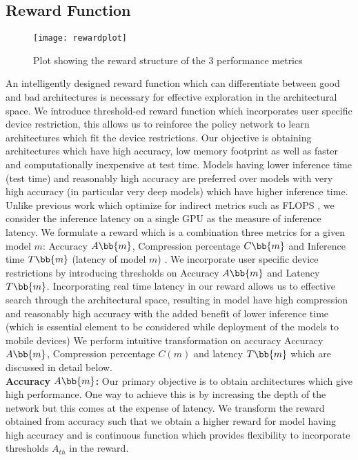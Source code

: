 \documentclass[../main]{subfiles}
\begin{document}
    \subsection{Reward Function}
        \label{sec:num3}
        \begin{figure}[t]
			\centering
			\texttt{[image: rewardplot]}
			\caption{Plot showing the reward structure of the 3 performance metrics}
			\label{fig:rewardfunction}
		\end{figure}
        An intelligently designed reward function which can differentiate between good and bad architectures is necessary for effective exploration in the architectural space.
        We introduce threshold-ed reward function which incorporates user specific device restriction, this allows us to reinforce the policy network to learn architectures which fit the device restrictions.
        Our objective is obtaining architectures which have high accuracy, low memory footprint as well as faster and computationally inexpensive at test time.
        Models having lower inference time (test time) and reasonably high accuracy are preferred over models with very high accuracy (in particular very deep models) which have higher inference time.
        Unlike previous work which optimize for indirect metrics such as FLOPS \cite{he2018amc}, we consider the inference latency on a single GPU as the measure of inference latency.
        We formulate a reward which is a combination three metrics for a given model $m$: Accuracy $A \bb{m}$, Compression percentage $C \bb{m}$ and Inference time $T \bb{m}$ (latency of model $m$) .
        We incorporate user specific device restrictions by introducing thresholds on Accuracy $A \bb{m}$ and Latency $T \bb{m}$.
        Incorporating real time latency in our reward allows us to effective search through the architectural space, resulting in model have high compression and reasonably high accuracy with the added benefit of lower inference time (which is essential element to be considered while deployment of the models to mobile devices)
        We perform intuitive transformation on accuracy Accuracy $A \bb{m}$, Compression percentage $C(m)$ and latency $T\bb{m}$ which are discussed in detail below.\\
        \textbf{Accuracy $A\bb{m}$:} Our primary objective is to obtain architectures which give high performance.
        One way to achieve this is by increasing the depth of the network \cite{he2015deep,simonyan2014very} but this comes at the expense of latency.
        We transform the reward obtained from accuracy such that we obtain a higher reward for model having high accuracy and is continuous function which provides flexibility to incorporate thresholds $A_{th}$ in the reward.
\end{document}
